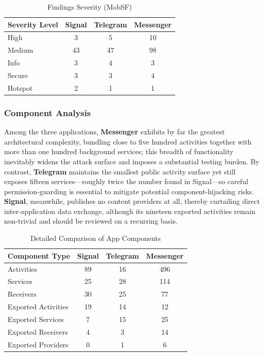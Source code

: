 \documentclass[a4paper,12pt]{report}
\begin{document}
\begin{table}[htbp]
  \centering
  \caption{Findings Severity (MobSF)}
  \label{tab:findings-severity}
  \begin{tabular}{|l|c|c|c|}
    \hline
    \textbf{Severity Level} & \textbf{Signal} & \textbf{Telegram} & \textbf{Messenger} \\ \hline
    High & 3 & 5 & 10 \\ \hline
    Medium & 43 & 47 & 98 \\ \hline
    Info & 3 & 4 & 3 \\ \hline
    Secure & 3 & 3 & 4 \\ \hline
    Hotspot & 2 & 1 & 1 \\ \hline
  \end{tabular}
\end{table}


\subsubsection{Component Analysis}

Among the three applications, \textbf{Messenger} exhibits by far
 the greatest architectural complexity, bundling close to five
  hundred activities together with more than one hundred background
  services; this breadth of functionality inevitably widens the attack
  surface and imposes a substantial testing burden. By contrast,
   \textbf{Telegram} maintains the smallest public activity surface yet
   still exposes fifteen services—roughly twice the number found in Signal—so
    careful permission-guarding is essential to mitigate potential
     component-hijacking risks. \textbf{Signal}, meanwhile, publishes
      no content providers at all, thereby curtailing direct inter-application
      data exchange, although its nineteen exported activities remain non-trivial
      and should be reviewed on a recurring basis.

\begin{table}[htbp]
  \centering
  \caption{Detailed Comparison of App Components}
  \label{tab:app-components-horizontal}
  \begin{tabular}{|l|c|c|c|}
    \hline
    \textbf{Component Type} & \textbf{Signal} & \textbf{Telegram} & \textbf{Messenger} \\ \hline
    Activities & 89 & 16 & 496 \\ \hline
    Services & 25 & 28 & 114 \\ \hline
    Receivers & 30 & 25 & 77 \\ \hline

    Exported Activities & 19 & 14 & 12 \\ \hline
    Exported Services & 7 & 15 & 25 \\ \hline
    Exported Receivers & 4 & 3 & 14 \\ \hline
    Exported Providers & 0 & 1 & 6 \\ \hline
  \end{tabular}
\end{table}
\end{document}
